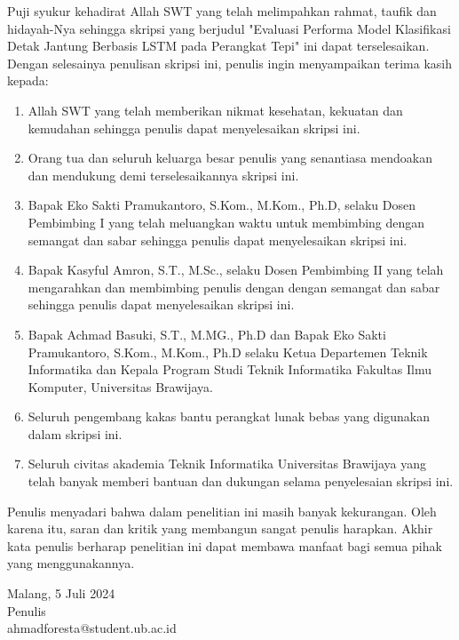 \documentclass{skripsi}
\begin{document}
{\preface

  Puji syukur kehadirat Allah SWT yang telah melimpahkan rahmat,
  taufik dan hidayah-Nya sehingga skripsi yang berjudul 
  "Evaluasi Performa Model Klasifikasi Detak Jantung Berbasis LSTM pada Perangkat Tepi" ini dapat terselesaikan. Dengan
  selesainya penulisan skripsi ini, penulis ingin menyampaikan terima kasih
  kepada:

  \begin{singlespace}
    \begin{enumerate}
  \item{Allah SWT yang telah memberikan nikmat kesehatan, kekuatan dan
      kemudahan sehingga penulis dapat menyelesaikan skripsi ini.}
  \item{Orang tua dan seluruh keluarga besar penulis yang
      senantiasa mendoakan dan mendukung demi terselesaikannya skripsi
      ini.}
  \item{Bapak Eko Sakti Pramukantoro, S.Kom., M.Kom., Ph.D, selaku Dosen Pembimbing I
      yang telah meluangkan waktu untuk membimbing dengan semangat dan
      sabar sehingga penulis dapat menyelesaikan skripsi ini.}
  \item{Bapak Kasyful Amron, S.T., M.Sc., selaku
      Dosen Pembimbing II yang telah mengarahkan dan membimbing
      penulis dengan dengan semangat dan sabar sehingga penulis dapat
      menyelesaikan skripsi ini.}
  \item {Bapak Achmad Basuki, S.T., M.MG., Ph.D dan Bapak Eko Sakti Pramukantoro, S.Kom., M.Kom., Ph.D selaku Ketua Departemen Teknik Informatika
      dan Kepala Program Studi Teknik Informatika Fakultas Ilmu
      Komputer, Universitas Brawijaya.}
  \item{Seluruh pengembang kakas bantu perangkat lunak bebas yang
      digunakan dalam skripsi ini.}
  \item{Seluruh civitas akademia Teknik Informatika Universitas
      Brawijaya yang telah banyak memberi bantuan dan dukungan selama
      penyelesaian skripsi ini.}
  \end{enumerate}
  \end{singlespace}

  Penulis menyadari bahwa dalam penelitian ini masih banyak
  kekurangan. Oleh karena itu, saran dan kritik yang membangun sangat
  penulis harapkan. Akhir kata penulis berharap penelitian ini dapat
  membawa manfaat bagi semua pihak yang menggunakannya.

  \vspace{0.8cm}

  \noindent
  \hspace*{8cm}Malang, 5 Juli 2024
  \vspace{1.5cm} \\
  \hspace*{8cm}Penulis \\
  \hspace*{8cm}ahmadforesta@student.ub.ac.id
}
\end{document}
